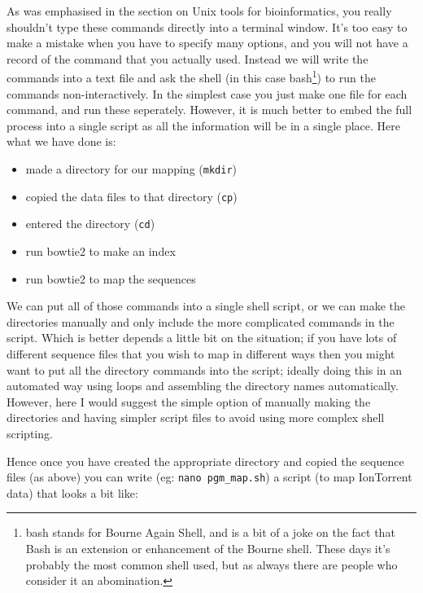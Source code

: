 \documentclass[11pt]{article}
\begin{document}
As was emphasised in the section on Unix tools for bioinformatics, you really
shouldn't type these commands directly into a terminal window. It's too easy
to make a mistake when you have to specify many options, and you will not
have a record of the command that you actually used. Instead we will write
the commands into a text file and ask the shell (in this case
bash\footnote{bash stands for Bourne Again Shell, and is a bit of a joke on the
fact that Bash is an extension or enhancement of the Bourne shell. These days
it's probably the most common shell used, but as always there are people who
consider it an abomination.
 }) to run the commands non-interactively. In the simplest case
you just make one file for each command, and run these seperately. However,
it is much better to embed the full process into a single script as all the
information will be in a single place. Here what we have done is:

\begin{itemize}
\item made a directory for our mapping (\texttt{mkdir})
\item copied the data files to that directory (\texttt{cp})
\item entered the directory (\texttt{cd})
\item run bowtie2 to make an index
\item run bowtie2 to map the sequences
\end{itemize}

We can put all of those commands into a single shell script, or we can make
the directories manually and only include the more complicated commands in
the script. Which is better depends a little bit on the situation; if you
have lots of different sequence files that you wish to map in different ways
then you might want to put all the directory commands into the script;
ideally doing this in an automated way using loops and
assembling the directory names automatically. However, here I would suggest
the simple option of manually making the directories and having simpler
script files to avoid using more complex shell scripting.

Hence once you have created the appropriate directory and copied the sequence
files (as above) you can write (eg: \texttt{nano pgm\_map.sh}) a script (to map
IonTorrent data) that looks a bit like:
\end{document}
